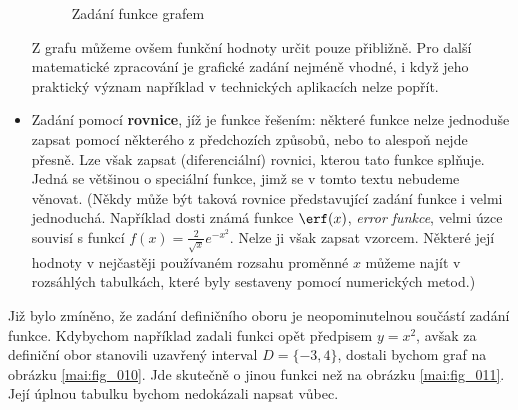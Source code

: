 \begin{itemize}[noitemsep]
          \begin{figure}[ht!]
            \centering  
            \caption{Zadání funkce grafem}
          \end{figure}
          Z grafu můžeme ovšem funkční hodnoty určit pouze přibližně. Pro další matematické 
          zpracování je grafické zadání nejméně vhodné, i když jeho praktický význam například v 
          technických aplikacích nelze popřít.
        \item Zadání pomocí \textbf{rovnice}, jíž je funkce řešením: některé funkce nelze jednoduše 
              zapsat pomocí některého z předchozích způsobů, nebo to alespoň nejde přesně. Lze však 
              zapsat (diferenciální) rovnici, kterou tato funkce splňuje. Jedná se většinou o 
              speciální funkce, jimž se v tomto textu nebudeme věnovat. (Někdy může být taková 
              rovnice  představující zadání funkce i velmi jednoduchá. Například dosti známá funkce 
              \(\erf(x)\), \emph{error funkce}, velmi úzce souvisí s funkcí \(f(x) = 
              \frac{2}{\sqrt{x}}e^{-x^2}\). Nelze ji však zapsat vzorcem. Některé její hodnoty v 
              nejčastěji používaném rozsahu proměnné \(x\) můžeme najít v rozsáhlých tabulkách, 
              které byly sestaveny pomocí numerických metod.)
      \end{itemize}
      
      Již bylo zmíněno, že zadání definičního oboru je neopominutelnou součástí zadání funkce. 
      Kdybychom například zadali funkci opět předpisem \(y=x^2\), avšak za definiční obor stanovili 
      uzavřený interval \(D = \lbrace -3,4\rbrace\), dostali bychom graf na obrázku 
      \ref{mai:fig_010}. Jde skutečně o jinou funkci než na obrázku \ref{mai:fig_011}. Její úplnou 
      tabulku bychom nedokázali napsat vůbec.
      

